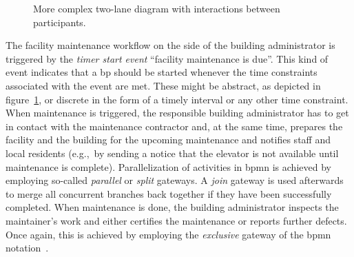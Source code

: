 \begin{figure}[h]
    \caption{More complex two-lane diagram with interactions between participants.}
    \label{fig:background:maintenance_full}
\end{figure}

The facility maintenance workflow on the side of the building administrator is triggered by the \textit{timer start event} ``facility maintenance is due''. This kind of event indicates that a \gls{bp} should be started whenever the time constraints associated with the event are met. These might be abstract, as depicted in figure~\ref{fig:background:maintenance_full}, or discrete in the form of a timely interval or any other time constraint. When maintenance is triggered, the responsible building administrator has to get in contact with the maintenance contractor and, at the same time, prepares the facility and the building for the upcoming maintenance and notifies staff and local residents (e.g.,\ by sending a notice that the elevator is not available until maintenance is complete). Parallelization of activities in \gls{bpmn} is achieved by employing so-called \textit{parallel} or \textit{split} gateways. A \textit{join} gateway is used afterwards to merge all concurrent branches back together if they have been successfully completed. When maintenance is done, the building administrator inspects the maintainer's work and either certifies the maintenance or reports further defects. Once again, this is achieved by employing the \textit{exclusive} gateway of the \gls{bpmn} notation~\cite{bpmn_v2_spec,weske2012_bpm_introduction}.




